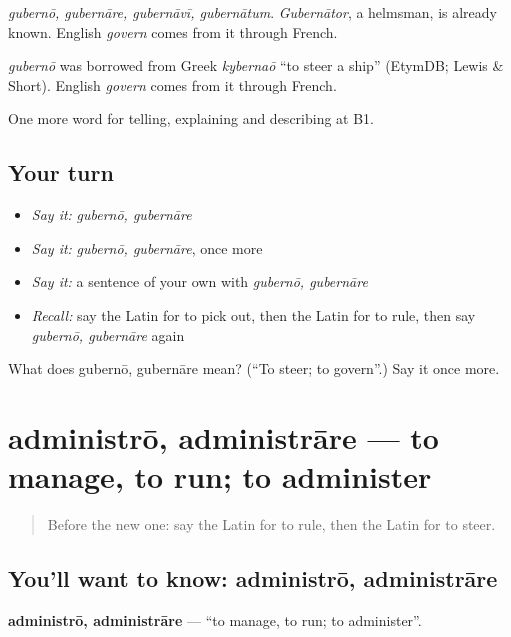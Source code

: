 \emph{gubernō, gubernāre, gubernāvī, gubernātum}. \emph{Gubernātor}, a helmsman, is already known. English \emph{govern} comes from it through French.

\begin{cousinweb}
\emph{gubernō} was borrowed from Greek \emph{kybernaō} \textquotedblleft{}to steer a ship\textquotedblright{} (EtymDB; Lewis \& Short). English \emph{govern} comes from it through French.
\end{cousinweb}

\begin{grammarlens}[title={What you've built}]
One more word for telling, explaining and describing at B1.
\end{grammarlens}

\subsection*{Your turn}
\begin{itemize}
\raggedright
  \item \emph{Say it:} \emph{gubernō, gubernāre}
  \item \emph{Say it:} \emph{gubernō, gubernāre}, once more
  \item \emph{Say it:} a sentence of your own with \emph{gubernō, gubernāre}
  \item \emph{Recall:} say the Latin for to pick out, then the Latin for to rule, then say \emph{gubernō, gubernāre} again
\end{itemize}

\begin{tcolorbox}[breakable,colback=teal!4,colframe=teal!35!black,title={Before you move on}]
What does gubernō, gubernāre mean? (\textquotedblleft{}To steer; to govern\textquotedblright{}.) Say it once more.
\end{tcolorbox}
\section[administrō, administrāre]{administrō, administrāre — to manage, to run; to administer}

\label{lesson:LA-C385-administro}



\begin{quote}
Before the new one: say the Latin for to rule, then the Latin for to steer.
\end{quote}

\subsection*{You'll want to know: administrō, administrāre}
\textbf{administrō, administrāre} — \textquotedblleft{}to manage, to run; to administer\textquotedblright{}.

